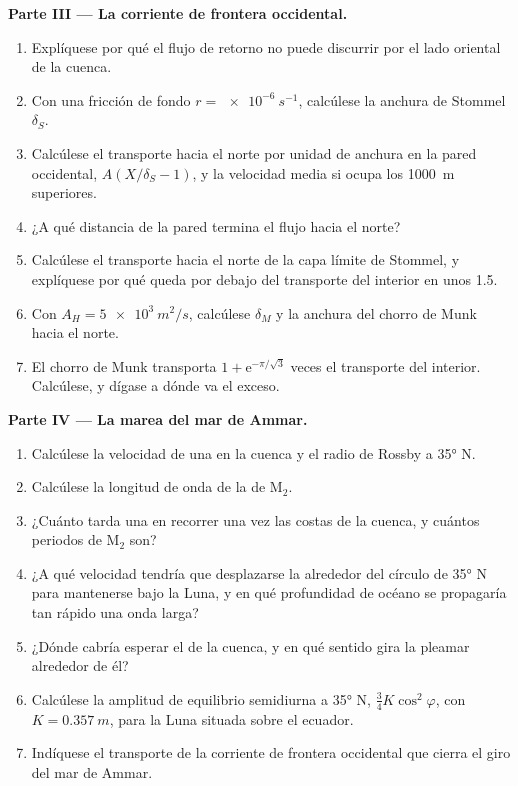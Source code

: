 \begin{problem}
\medskip\noindent\textbf{Parte III --- La corriente de frontera occidental.}
\begin{enumerate}[resume]
\item Explíquese por qué el flujo de retorno no puede discurrir por el lado oriental de la
  cuenca.
\item Con una fricción de fondo $r = \qty{e-6}{s^{-1}}$, calcúlese la
  anchura de Stommel $\delta_S$.
\item Calcúlese el transporte hacia el norte por unidad de anchura en la pared occidental,
  $A(X/\delta_S - 1)$, y la velocidad media si ocupa los
  \qty{1000}{m} superiores.
\item ¿A qué distancia de la pared termina el flujo hacia el norte?
\item Calcúlese el transporte hacia el norte de la capa límite de Stommel, y
  explíquese por qué queda por debajo del transporte del interior en unos
  \qty{1.5}{\sverdrup}.
\item Con $A_H = \qty{5e3}{m^2/s}$, calcúlese $\delta_M$ y la anchura del
  chorro de Munk hacia el norte.
\item El chorro de Munk transporta $1 + \mathrm e^{-\pi/\sqrt3}$ veces el transporte del
  interior. Calcúlese, y dígase a dónde va el exceso.
\end{enumerate}

\medskip\noindent\textbf{Parte IV --- La marea del mar de Ammar.}
\begin{enumerate}[resume]
\item Calcúlese la velocidad de una  en la cuenca y el radio de Rossby
  a \ang{35} N.
\item Calcúlese la longitud de onda de la  de M$_2$.
\item ¿Cuánto tarda una  en recorrer una vez las costas de
  la cuenca, y cuántos periodos de M$_2$ son?
\item ¿A qué velocidad tendría que desplazarse la  alrededor del
  círculo de \ang{35} N para mantenerse bajo la Luna, y en qué profundidad de océano
  se propagaría tan rápido una onda larga?
\item ¿Dónde cabría esperar el  de la cuenca, y en qué
  sentido gira la pleamar alrededor de él?
\item Calcúlese la amplitud de equilibrio semidiurna a \ang{35} N, $\tfrac34
  K\cos^2\varphi$, con $K = \qty{0.357}{m}$, para la Luna situada sobre el ecuador.
\item Indíquese el transporte de la corriente de frontera occidental que cierra el
  giro del mar de Ammar.
\end{enumerate}
\end{problem}
